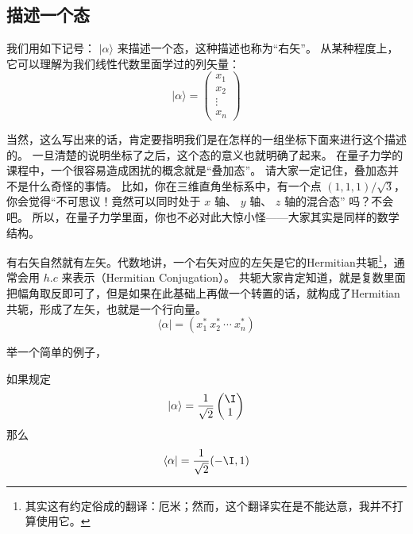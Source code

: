 
\subsection{描述一个态}

我们用如下记号： $|\alpha\rangle$ 来描述一个态，这种描述也称为“右矢”。 从某种程度上，它可以理解为我们线性代数里面学过的列矢量：
\begin{equation}
|\alpha\rangle = \left(\begin{matrix}x_1\\x_2\\ \vdots\\ x_n\end{matrix}\right)
\end{equation}

当然，这么写出来的话，肯定要指明我们是在怎样的一组坐标下面来进行这个描述的。 一旦清楚的说明坐标了之后，这个态的意义也就明确了起来。 在量子力学的课程中，一个很容易造成困扰的概念就是“叠加态”。 请大家一定记住，叠加态并不是什么奇怪的事情。 比如，你在三维直角坐标系中，有一个点 $(1, 1, 1)/\sqrt3$，你会觉得“不可思议！竟然可以同时处于 $x$ 轴、 $y$ 轴、 $z$ 轴的混合态” 吗？不会吧。 所以，在量子力学里面，你也不必对此大惊小怪——大家其实是同样的数学结构。

有右矢自然就有左矢。代数地讲，一个右矢对应的左矢是它的Hermitian共轭\footnote{其实这有约定俗成的翻译：厄米；然而，这个翻译实在是不能达意，我并不打算使用它。}，通常会用 $h. c$ 来表示（Hermitian Conjugation）。 共轭大家肯定知道，就是复数里面把幅角取反即可了，但是如果在此基础上再做一个转置的话，就构成了Hermitian共轭，形成了左矢，也就是一个行向量。
\begin{equation}
\langle\alpha| = (x_1^*\ x_2^*\ \cdots\ x_n^*)
\end{equation}

举一个简单的例子，

\begin{example}{}
如果规定
\begin{equation}
|\alpha\rangle = \frac{1}{\sqrt{2}}\left(\begin{matrix}\I \\1\end{matrix}\right) 
\end{equation}
那么
\begin{equation}
\langle\alpha| = \frac{1}{\sqrt{2}}(-\I, 1)
\end{equation}
\end{example}


